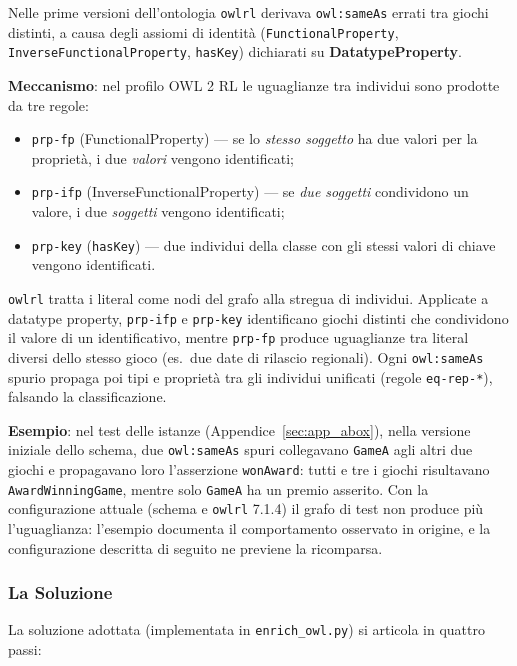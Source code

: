 Nelle prime versioni dell'ontologia \texttt{owlrl} derivava \texttt{owl:sameAs} errati tra giochi
distinti, a causa degli assiomi di identit\`a (\texttt{FunctionalProperty},
\texttt{InverseFunctionalProperty}, \texttt{hasKey}) dichiarati su \textbf{DatatypeProperty}.

\textbf{Meccanismo}: nel profilo OWL 2 RL le uguaglianze tra individui
sono prodotte da tre regole:
\begin{itemize}[nosep]
  \item \texttt{prp-fp} (FunctionalProperty) --- se lo \emph{stesso soggetto} ha due
    valori per la propriet\`a, i due \emph{valori} vengono identificati;
  \item \texttt{prp-ifp} (InverseFunctionalProperty) --- se \emph{due soggetti}
    condividono un valore, i due \emph{soggetti} vengono identificati;
  \item \texttt{prp-key} (\texttt{hasKey}) --- due individui della classe con gli
    stessi valori di chiave vengono identificati.
\end{itemize}
\texttt{owlrl} tratta i literal come nodi del grafo alla stregua di individui.
Applicate a datatype property, \texttt{prp-ifp} e \texttt{prp-key} identificano
giochi distinti che condividono il valore di un identificativo, mentre \texttt{prp-fp}
produce uguaglianze tra literal diversi dello stesso gioco (es.\ due date di rilascio
regionali). Ogni \texttt{owl:sameAs} spurio propaga poi tipi e propriet\`a tra gli
individui unificati (regole \texttt{eq-rep-*}), falsando la classificazione.

\textbf{Esempio}: nel test delle istanze (Appendice~\ref{sec:app_abox}), nella versione iniziale dello
schema, due \texttt{owl:sameAs} spuri collegavano \texttt{GameA} agli altri due giochi e propagavano loro
l'asserzione \texttt{wonAward}: tutti e tre i giochi risultavano \texttt{AwardWinningGame}, mentre solo
\texttt{GameA} ha un premio asserito. Con la configurazione attuale (schema e \texttt{owlrl} 7.1.4) il
grafo di test non produce pi\`u l'uguaglianza: l'esempio documenta il comportamento osservato in
origine, e la configurazione descritta di seguito ne previene la ricomparsa.

\subsubsection{La Soluzione}

La soluzione adottata (implementata in \texttt{enrich\_owl.py}) si articola in
quattro passi:


